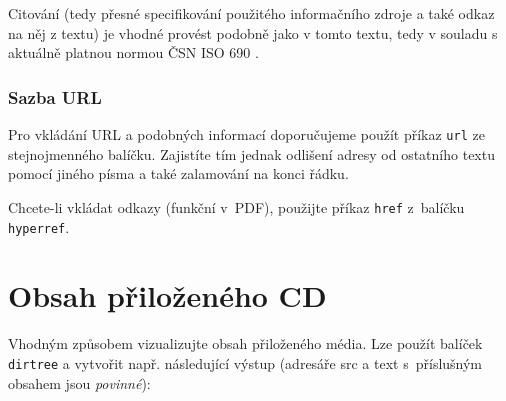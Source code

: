 \documentclass[thesis=B,czech]{FITthesis}[2019/03/06]
\begin{document}
Citování (tedy přesné specifikování použitého informačního zdroje a také odkaz na něj z textu) je vhodné provést podobně jako v tomto textu, tedy v souladu s aktuálně platnou normou ČSN ISO 690 \cite{iso690}.

\subsection{Sazba URL}

Pro vkládání URL a podobných informací doporučujeme použít příkaz \verb|url| ze stejnojmenného balíčku. Zajistíte tím jednak odlišení adresy od ostatního textu pomocí jiného písma a také zalamování na konci řádku.

Chcete-li vkládat odkazy (funkční v~PDF), použijte příkaz \verb|href| z~balíčku \verb|hyperref|.


\chapter{Obsah přiloženého CD}

Vhodným způsobem vizualizujte obsah přiloženého média. Lze použít balíček \verb|dirtree| a vytvořit např. následující výstup (adresáře src a text s~příslušným obsahem jsou \emph{povinné}):

\begin{figure}
\end{figure}
\end{document}
